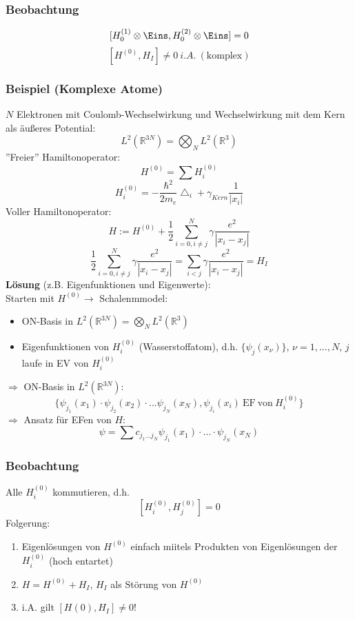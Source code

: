 \documentclass[twoside,a4paper]{scrartcl}
\renewcommand{\1}{\mathds{1}}
\newcommand{\ra}{\rightarrow}
\begin{document}
\subsubsection*{Beobachtung}
$$[H_0^{(1)} \otimes \Eins, H_0^{(2)} \otimes \Eins]=0$$
$$[H^{(0)},H_I]\neq0 \ i.A. \ \mathrm{(komplex)} $$
\subsubsection*{Beispiel (Komplexe Atome)}
$N$ Elektronen mit Coulomb-Wechselwirkung und Wechselwirkung mit dem Kern als äußeres Potential:
$$L^2(\mathbb R^{3N})=\bigotimes_N L^2(\mathbb R^{3})$$
''Freier'' Hamiltonoperator:
$$H^{(0)}=\sum H_i^{(0)}$$
$$H_i^{(0)}=-\frac{\hbar^2}{2m_e}\bigtriangleup_i +\gamma_{Kern} \frac{1}{|x_i|}$$
Voller Hamiltonoperator:
$$H:=H^{(0)}+\frac{1}{2}\sum_{i=0,i \neq j}^N\gamma \frac{e^2}{|x_i-x_j|}$$
$$\frac{1}{2}\sum_{i=0,i \neq j}^N\gamma \frac{e^2}{|x_i-x_j|}=\sum_{i<j}\gamma \frac{e^2}{|x_i-x_j|}=H_I$$
\textbf{Lösung} (z.B. Eigenfunktionen und Eigenwerte):\\
Starten mit $H^{(0)} \ra$ Schalenmmodel:
\begin{itemize}
 \item ON-Basis in $L^2(\mathbb R^{3N})=\bigotimes_N L^2(\mathbb R^3)$
 \item Eigenfunktionen von $H_i^{(0)}$ (Wasserstoffatom), d.h. $\{ \psi_j(x_\nu) \}$, $\nu=1, ... ,N$, $j$ laufe in EV von $H_i^{(0)}$
\end{itemize}
 $\Rightarrow$ ON-Basis in $L^2(\mathbb R^{3N})$:
$$\{\psi_{j_1}(x_1) \cdot \psi_{j_2}(x_2) \cdot ... \psi_{j_N}(x_N), \psi_{j_i}(x_i) \mathrm{\ EF\ von \ } H_i^{(0)} \}$$
 $\Rightarrow$ Ansatz für EFen von $H$:
$$\psi=\sum c_{j_1...j_N}\psi_{j_1}(x_1)\cdot ... \cdot \psi_{j_N}(x_N)$$

\subsubsection*{Beobachtung}
Alle $H_i^{(0)}$ kommutieren, d.h. 
$$[H_i^{(0)},H_j^{(0)}]=0$$
Folgerung: 
\begin{enumerate}
\item Eigenlösungen von $H^{(0)}$ einfach miitels Produkten von Eigenlösungen der $H_i^{(0)}$ (hoch entartet)
\item $H=H^{(0)}+H_I$, $H_I$ als Störung von $H^{(0)}$
\item i.A. gilt $[H{(0)},H_I]\neq 0$!
\end{enumerate}
\end{document}
